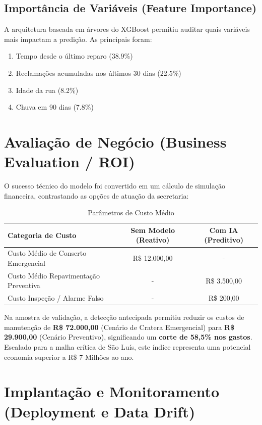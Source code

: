 \documentclass[12pt,a4paper]{article}
\begin{document}
\subsection{Importância de Variáveis (Feature Importance)}
A arquitetura baseada em árvores do XGBoost permitiu auditar quais variáveis mais impactam a predição. As principais foram:
\begin{enumerate}
    \item Tempo desde o último reparo (38.9\%)
    \item Reclamações acumuladas nos últimos 30 dias (22.5\%)
    \item Idade da rua (8.2\%)
    \item Chuva em 90 dias (7.8\%)
\end{enumerate}

\section{Avaliação de Negócio (Business Evaluation / ROI)}
O sucesso técnico do modelo foi convertido em um cálculo de simulação financeira, contrastando as opções de atuação da secretaria:

\begin{table}[H]
\centering
\begin{tabular}{@{}lcc@{}}
\toprule
\textbf{Categoria de Custo} & \textbf{Sem Modelo (Reativo)} & \textbf{Com IA (Preditivo)} \\ \midrule
Custo Médio de Conserto Emergencial & R\$ 12.000,00 & - \\
Custo Médio Repavimentação Preventiva & - & R\$ 3.500,00 \\
Custo Inspeção / Alarme Falso & - & R\$ 200,00 \\ \bottomrule
\end{tabular}
\caption{Parâmetros de Custo Médio}
\end{table}

Na amostra de validação, a detecção antecipada permitiu reduzir os custos de manutenção de \textbf{R\$ 72.000,00} (Cenário de Cratera Emergencial) para \textbf{R\$ 29.900,00} (Cenário Preventivo), significando um \textbf{corte de 58,5\% nos gastos}. Escalado para a malha crítica de São Luís, este índice representa uma potencial economia superior a R\$ 7 Milhões ao ano.

\section{Implantação e Monitoramento (Deployment e Data Drift)}
\end{document}
